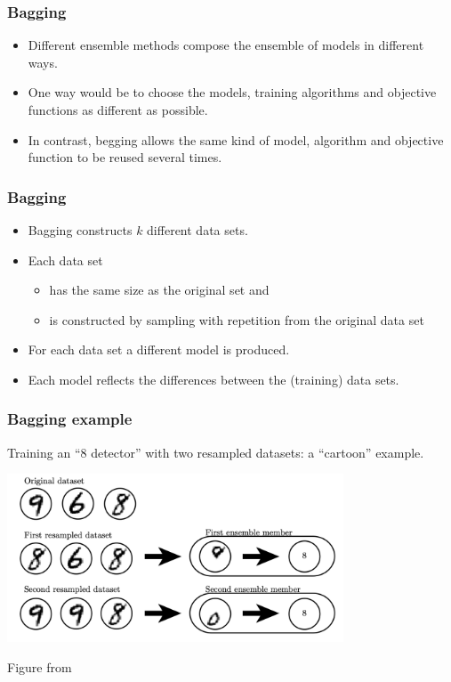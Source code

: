 \documentclass[notes]{beamer}          %
\begin{document}
\begin{frame}
\frametitle{Bagging}
    \begin{itemize}
        \item Different ensemble methods compose the ensemble of models in different ways.
        \item One way would be to choose the models, training algorithms and objective functions as different as possible.
        \item In contrast, begging allows the same kind of model, algorithm and objective function to be reused several times.
    \end{itemize}

\end{frame}

\begin{frame}
\frametitle{Bagging}
    \begin{itemize}
        \item Bagging constructs $k$ different data sets.
        \item Each data set
        \begin{itemize}
            \item has the same size as the original set and
            \item is constructed by sampling with repetition from the original data set
        \end{itemize}
        \item For each data set a different model is produced.
        \item Each model reflects the differences between the (training) data sets.
    \end{itemize}

\end{frame}

\begin{frame}
\frametitle{Bagging example}
    Training an ``8 detector'' with two resampled datasets: a ``cartoon'' example.
    \begin{center}
        \includegraphics[width=0.75\textwidth]{../figures/week_1/bagging_cartoon.png}
    \end{center}
    \tiny{Figure from \cite{deeplearning}}
\end{frame}
\end{document}
